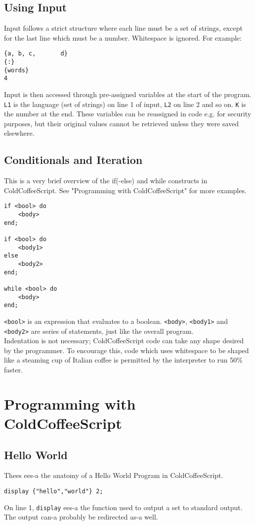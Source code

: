 \documentclass{article}
\begin{document}
\subsection{Using Input}
Input follows a strict structure where each line must be a set of strings, except for the last line which must be a number. Whitespace is ignored. For example:
\begin{lstlisting}
{a, b, c,       d}
{:}
{words}
4
\end{lstlisting}
Input is then accessed through pre-assigned variables at the start of the program. \lstinline|L1| is the language (set of strings) on line 1 of input, \lstinline|L2| on line 2 and so on. \lstinline|K| is the number at the end. These variables can be reassigned in code e.g. for security purposes, but their original values cannot be retrieved unless they were saved elsewhere.
\subsection{Conditionals and Iteration}
This is a very brief overview of the if(-else) and while constructs in ColdCoffeeScript. See "Programming with ColdCoffeeScript" for more examples.
\begin{lstlisting}
if <bool> do
    <body>
end;

if <bool> do
    <body1>
else
    <body2>
end;

while <bool> do
    <body>
end;
\end{lstlisting}
\lstinline|<bool>| is an expression that evaluates to a boolean. \lstinline|<body>|, \lstinline|<body1>| and \lstinline|<body2>| are series of statements, just like the overall program. \\
Indentation is not necessary; ColdCoffeeScript code can take any shape desired by the programmer. To encourage this, code which uses whitespace to be shaped like a steaming cup of Italian coffee is permitted by the interpreter to run 50\% faster.
\section{Programming with ColdCoffeeScript}
\subsection{Hello World}
Thees ees-a the anatomy of a Hello World Program in ColdCoffeeScript.
\begin{lstlisting}
display {"hello","world"} 2;
\end{lstlisting}
On line 1, \lstinline|display| ees-a the function used to output a set to standard output. The output can-a probably be redirected as-a well.
\end{document}
